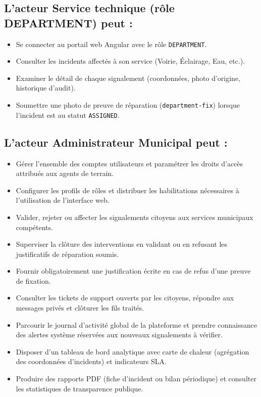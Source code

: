 \subsection{L'acteur Service technique (rôle DEPARTMENT) peut :}
\begin{itemize}
    \item Se connecter au portail web Angular avec le rôle \texttt{DEPARTMENT}.
    \item Consulter les incidents affectés à son service (Voirie, Éclairage, Eau, etc.).
    \item Examiner le détail de chaque signalement (coordonnées, photo d'origine, historique d'audit).
    \item Soumettre une photo de preuve de réparation (\texttt{department-fix}) lorsque l'incident est au statut \texttt{ASSIGNED}.
\end{itemize}

\subsection{L'acteur Administrateur Municipal peut :}
\begin{itemize}
    \item Gérer l'ensemble des comptes utilisateurs et paramétrer les droits d'accès attribués aux agents de terrain.
    \item Configurer les profils de rôles et distribuer les habilitations nécessaires à l'utilisation de l'interface web.
    \item Valider, rejeter ou affecter les signalements citoyens aux services municipaux compétents.
    \item Superviser la clôture des interventions en validant ou en refusant les justificatifs de réparation soumis.
    \item Fournir obligatoirement une justification écrite en cas de refus d'une preuve de fixation.
    \item Consulter les tickets de support ouverts par les citoyens, répondre aux messages privés et clôturer les fils traités.
    \item Parcourir le journal d'activité global de la plateforme et prendre connaissance des alertes système réservées aux nouveaux signalements à vérifier.
    \item Disposer d'un tableau de bord analytique avec carte de chaleur (agrégation des coordonnées d'incidents) et indicateurs SLA.
    \item Produire des rapports PDF (fiche d'incident ou bilan périodique) et consulter les statistiques de transparence publique.
\end{itemize}

